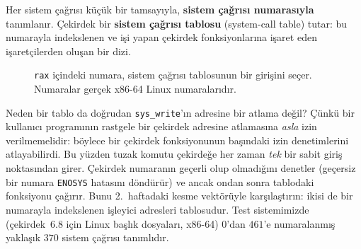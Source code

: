 \documentclass[11pt,a4paper]{article}
\newcommand{\term}[1]{\textbf{\color{mintdeep}#1}}
\newcommand{\cmd}[1]{\texttt{#1}}
\begin{document}
Her sistem çağrısı küçük bir tamsayıyla, \term{sistem çağrısı numarasıyla} tanımlanır. Çekirdek bir \term{sistem çağrısı tablosu} (system-call table) tutar: bu numarayla indekslenen ve işi yapan çekirdek fonksiyonlarına işaret eden işaretçilerden oluşan bir dizi.

\begin{figure}[H]
\centering
{}
\caption{\texttt{rax} içindeki numara, sistem çağrısı tablosunun bir girişini seçer. Numaralar gerçek x86-64 Linux numaralarıdır.}
\end{figure}

Neden bir tablo da doğrudan \cmd{sys\_write}'ın adresine bir atlama değil? Çünkü bir kullanıcı programının rastgele bir çekirdek adresine atlamasına \emph{asla} izin verilmemelidir: böylece bir çekirdek fonksiyonunun başındaki izin denetimlerini atlayabilirdi. Bu yüzden tuzak komutu çekirdeğe her zaman \emph{tek} bir sabit giriş noktasından girer. Çekirdek numaranın geçerli olup olmadığını denetler (geçersiz bir numara \texttt{ENOSYS} hatasını döndürür) ve ancak ondan sonra tablodaki fonksiyonu çağırır. Bunu 2.~haftadaki kesme vektörüyle karşılaştırın: ikisi de bir numarayla indekslenen işleyici adresleri tablosudur. Test sistemimizde (çekirdek~6.8 için Linux başlık dosyaları, x86-64) $0$'dan $461$'e numaralanmış yaklaşık $370$ sistem çağrısı tanımlıdır.
\end{document}
